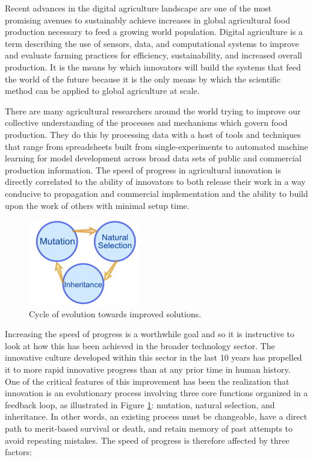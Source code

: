 \documentclass[11pt]{article}
\begin{document}
Recent advances in the digital agriculture landscape are one of the most promising avenues to sustainably achieve increases in global 
agricultural food production necessary to feed a growing world population.  Digital agriculture is a term describing the use of sensors, data, 
and computational systems to improve and evaluate farming practices for efficiency, sustainability, and increased overall production.  It is the 
means by which innovators will build the systems that feed the world of the future because it is the only means by which the scientific method 
can be applied to global agriculture at scale.

There are many agricultural researchers around the world trying to improve our collective understanding of the processes and mechanisms 
which govern food production.  They do this by processing data with a host of tools and techniques that range from spreadsheets built from 
single-experiments to automated machine learning for model development across broad data sets of public and commercial production 
information.  The speed of progress in agricultural innovation is directly correlated to the ability of innovators to both release their work in a way 
conducive to propagation and commercial implementation and the ability to build upon the work of others with minimal setup time.  
\begin{figure} 
\vspace{-25pt}
  \begin{center} \includegraphics[width=0.43\textwidth,trim={20 19 0 23},clip]{EvolutionCycle}
       \vspace{-20pt}
    \caption{Cycle of evolution towards improved solutions.} 
\label{fg:EvolutionCycle}
  \end{center}
  \vspace{-25pt}
\end{figure} 
Increasing the speed of progress is a worthwhile goal and so it is instructive to look at how this has been achieved in the broader 
technology sector.  The innovative culture developed within this sector in the last 10 years has propelled it to more rapid innovative progress 
than at any prior time in human history.  One of the critical features of this improvement has been the 
realization that innovation is an evolutionary 
process involving three core functions organized in a feedback loop, as illustrated in Figure \ref{fg:EvolutionCycle}: mutation, 
natural selection, and inheritance. 
In other words, an existing process must be changeable, have a direct path to merit-based survival or death, and retain memory of past 
attempts to avoid repeating mistakes.  The speed of progress is therefore affected by three factors:
\end{document}
